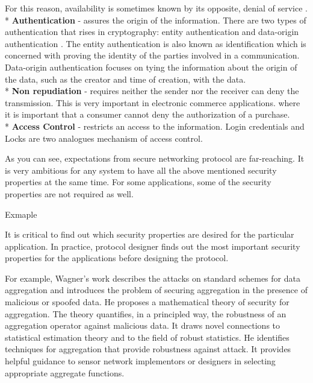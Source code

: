 	For this reason, availability is sometimes known by its opposite, denial of service \cite{pfleeger2002security}.
	\\*
	\textbf{Authentication} - assures the origin of the information.
	There are two types of authentication that rises in cryptography: entity authentication and data-origin authentication \cite{trappe2006introduction}.
	The entity authentication is also known as identification which is concerned with proving the identity of the parties involved in a communication.
	Data-origin authentication focuses on tying the information about the origin of the data, such as the creator and time of creation, with the data.\\*
	\textbf{Non repudiation} - requires neither the sender nor the receiver can deny the transmission.
	This is very important in electronic commerce applications. where it is important that a consumer cannot deny the authorization of a purchase.
	\\*
	\textbf{Access Control} - restricts an access to the information.
	Login credentials and Locks are two analogues mechanism of access control.

	As you can see, expectations from secure networking protocol are far-reaching.
	It is very ambitious for any system to have all the above mentioned security properties at the same time. 
	For some applications, some of the security properties are not required as well.
	

	
	Exmaple
	
	It is critical to find out which security properties are desired for the particular application.
	In practice, protocol designer finds out the most important security properties for the applications before designing the protocol.

	For example, Wagner's work \cite{wagner2004resilient} describes the attacks on standard schemes for data aggregation and introduces the problem of securing aggregation in the presence of malicious or spoofed data.
	He proposes a mathematical theory of security for aggregation.
	The theory quantifies, in a principled way, the robustness of an aggregation operator against malicious data.
	It draws novel connections to statistical estimation theory and to the field of robust statistics.
	He identifies techniques for aggregation that provide robustness against attack. 
	It provides helpful guidance to sensor network implementors or designers in selecting appropriate aggregate functions.

